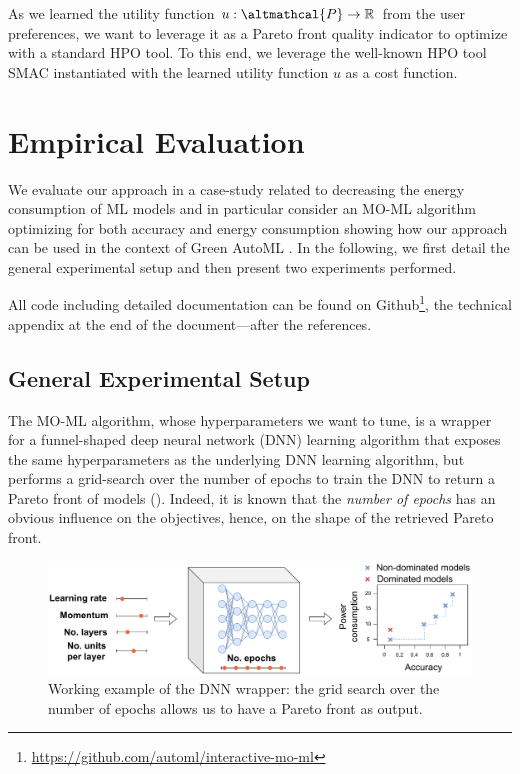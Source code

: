 As we learned the utility function $u: \altmathcal{P} \rightarrow \mathbb{R}$ from the user preferences, we want to leverage it as a Pareto front quality indicator to optimize with a standard HPO tool. To this end, we leverage the well-known HPO tool SMAC \cite{hutter-lion11a,lindauer-jmlr22a} instantiated with the learned utility function $u$ as a cost function. 
\section{Empirical Evaluation}
\label{moo-sec:evaluation}

We evaluate our approach in a case-study related to decreasing the energy consumption of ML models and in particular consider an MO-ML algorithm optimizing for both accuracy and energy consumption showing how our approach can be used in the context of Green AutoML \cite{tornede-jair23a}. In the following, we first detail the general experimental setup and then present two experiments performed.

All code including detailed documentation can be found on Github\footnote{\url{https://github.com/automl/interactive-mo-ml}}, the technical appendix at the end of the document---after the references.

\subsection{General Experimental Setup}
\label{moo-ssec:experimental_setup}

The MO-ML algorithm, whose hyperparameters we want to tune, is a wrapper for a funnel-shaped deep neural network (DNN) learning algorithm that exposes the same hyperparameters as the underlying DNN learning algorithm, but performs a grid-search over the number of epochs to train the DNN to return a Pareto front of models ().
Indeed, it is known that the \textit{number of epochs} has an obvious influence on the objectives, hence, on the shape of the retrieved Pareto front.

\begin{figure}[h]
    \centering
    \includegraphics[width=0.8\columnwidth]{chapters/human-centric/moo/img/grid_search.pdf}
    \caption{Working example of the DNN wrapper: the grid search over the number of epochs allows us to have a Pareto front as output.}
    \label{moo-fig:grid_search}
\end{figure}

